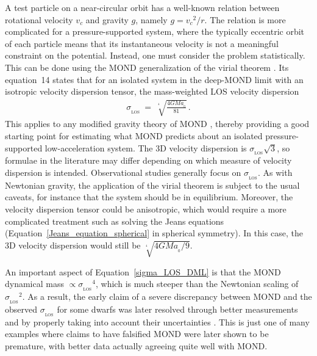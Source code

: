 \documentclass[fleqn,usenatbib,useAMS]{mnras} %
\begin{document}
A test particle on a near-circular orbit has a well-known relation between rotational velocity $v_c$ and gravity $g$, namely $g = {v_c}^2/r$. The relation is more complicated for a pressure-supported system, where the typically eccentric orbit of each particle means that its instantaneous velocity is not a meaningful constraint on the potential. Instead, one must consider the problem statistically. This can be done using the MOND generalization of the virial theorem \citep{Milgrom_1994_virial}. Its equation~14 states that for an isolated system in the deep-MOND limit with an isotropic velocity dispersion tensor, the mass-weighted LOS velocity dispersion
\begin{eqnarray}
	\sigma_{_\text{LOS}} ~=~ \sqrt[^4]{\frac{4GMa_{_0}}{81}} \, .
	\label{sigma_LOS_DML}
\end{eqnarray}
This applies to any modified gravity theory of MOND \citep{Milgrom_2014}, thereby providing a good starting point for estimating what MOND predicts about an isolated pressure-supported low-acceleration system. The 3D velocity dispersion is $\sigma_{_\text{LOS}} \sqrt{3}$, so formulae in the literature may differ depending on which measure of velocity dispersion is intended. Observational studies generally focus on $\sigma_{_\text{LOS}}$. As with Newtonian gravity, the application of the virial theorem is subject to the usual caveats, for instance that the system should be in equilibrium. Moreover, the velocity dispersion tensor could be anisotropic, which would require a more complicated treatment such as solving the Jeans equations (Equation~\ref{Jeans_equation_spherical} in spherical symmetry). In this case, the 3D velocity dispersion would still be $\sqrt[^4]{4GMa_{_0}/9}$.

An important aspect of Equation~\ref{sigma_LOS_DML} is that the MOND dynamical mass $\propto {\sigma_{_\text{LOS}}}^4$, which is much steeper than the Newtonian scaling of ${\sigma_{_\text{LOS}}}^2$. As a result, the early claim of a severe discrepancy between MOND and the observed $\sigma_{_\text{LOS}}$ for some dwarfs \citep{Gerhard_1992} was later resolved through better measurements and by properly taking into account their uncertainties \citep{Milgrom_1995}. This is just one of many examples where claims to have falsified MOND were later shown to be premature, with better data actually agreeing quite well with MOND.
\end{document}
